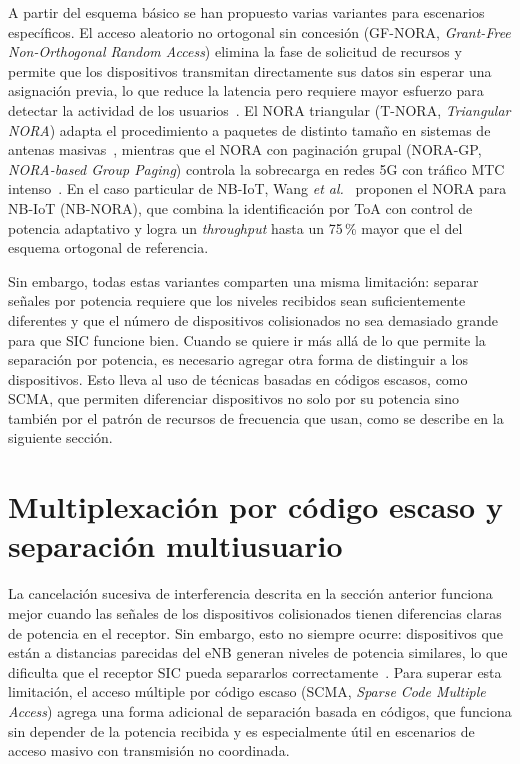 A partir del esquema básico se han propuesto varias variantes para escenarios específicos.
El acceso aleatorio no ortogonal sin concesión (GF-NORA,
\textit{Grant-Free Non-Orthogonal Random Access}) elimina la fase de solicitud de recursos y
permite que los dispositivos transmitan directamente sus datos sin esperar una asignación
previa, lo que reduce la latencia pero requiere mayor esfuerzo para detectar la actividad
de los usuarios~\cite{ref14}. El NORA triangular (T-NORA, \textit{Triangular NORA}) adapta el
procedimiento a paquetes de distinto tamaño en sistemas de antenas masivas~\cite{ref15},
mientras que el NORA con paginación grupal (NORA-GP, \textit{NORA-based Group Paging})
controla la sobrecarga en redes 5G con tráfico MTC intenso~\cite{ref16}. En el caso
particular de NB-IoT, Wang \textit{et al.}~\cite{ref4} proponen el NORA para NB-IoT
(NB-NORA), que combina la identificación por ToA con control de potencia adaptativo y logra un
\textit{throughput} hasta un 75\,\% mayor que el del esquema ortogonal de referencia.

Sin embargo, todas estas variantes comparten una misma limitación: separar señales por
potencia requiere que los niveles recibidos sean suficientemente diferentes y que el número
de dispositivos colisionados no sea demasiado grande para que SIC funcione bien. Cuando se
quiere ir más allá de lo que permite la separación por potencia, es necesario agregar otra
forma de distinguir a los dispositivos. Esto lleva al uso de técnicas basadas en códigos
escasos, como SCMA, que permiten diferenciar dispositivos no solo por su potencia sino
también por el patrón de recursos de frecuencia que usan, como se describe en la siguiente
sección.


\section{Multiplexación por código escaso y separación multiusuario}

La cancelación sucesiva de interferencia descrita en la sección anterior funciona mejor
cuando las señales de los dispositivos colisionados tienen diferencias claras de potencia en
el receptor. Sin embargo, esto no siempre ocurre: dispositivos que están a distancias
parecidas del eNB generan niveles de potencia similares, lo que dificulta que
el receptor SIC pueda separarlos correctamente~\cite{ref10}. Para superar esta limitación,
el acceso múltiple por código escaso (SCMA, \textit{Sparse Code Multiple Access}) agrega una
forma adicional de separación basada en códigos, que funciona sin depender de la potencia
recibida y es especialmente útil en escenarios de acceso masivo con transmisión no coordinada.

